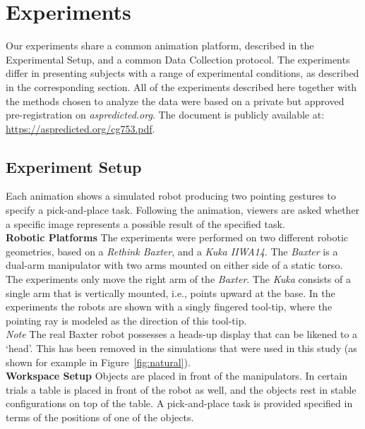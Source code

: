 \documentclass[letterpaper]{article} %
\begin{document}
\section{Experiments}
\label{experiments}


Our experiments share a common animation platform, described in the Experimental Setup, and a common Data Collection protocol.  The experiments differ in presenting subjects with a range of experimental conditions, as described in the corresponding section.  All of the experiments described here together with the methods chosen to analyze the data were based on a private but approved pre-registration on \textit{aspredicted.org}. The document is publicly available at: \url{https://aspredicted.org/cg753.pdf}.




\subsection{Experiment Setup}
Each animation shows a simulated robot producing two pointing gestures to specify a pick-and-place task.  Following the animation, viewers are asked whether a specific image represents a possible result of the specified task.\\

\noindent\textbf{Robotic Platforms} The experiments were performed on two different robotic geometries, based on a \textit{Rethink Baxter}, and a \textit{Kuka IIWA14}.  The \textit{Baxter} is a dual-arm manipulator with two arms mounted on either side of a static torso. The experiments only move the right arm of the \textit{Baxter}. The \textit{Kuka}  consists of a single arm that is vertically mounted, i.e., points upward at the base. In the experiments the robots are shown with a singly fingered tool-tip, where the pointing ray is modeled as the direction of this tool-tip.\\

\noindent\textit{Note} The real Baxter robot possesses a heads-up display that can be likened to a `head'. This has been removed in the simulations that were used in this study (as shown for example in Figure~\ref{fig:natural}).\\

\noindent\textbf{Workspace Setup} Objects are placed in front of the manipulators. In certain trials a table is placed in front of the robot as well, and the objects rest in stable configurations on top of the table. A pick-and-place task is provided specified in terms of the positions of one of the objects. \\
\end{document}
